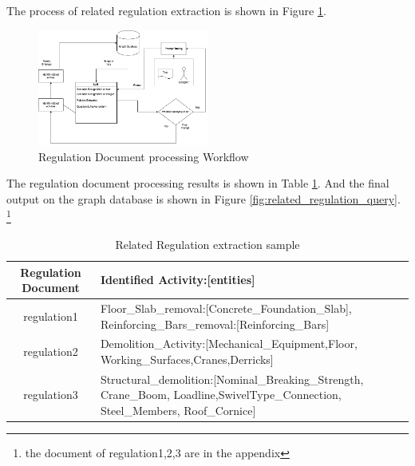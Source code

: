 The process of related regulation extraction is shown in Figure \ref{fig:related_regulation_workflow}.
\begin{figure}
    \label{fig:related_regulation_workflow}
    \centering
    \includegraphics[width=0.5\textwidth]{figures/text_extraction.png}
    \caption{Regulation Document processing Workflow}
\end{figure}

The regulation document processing results is shown in Table \ref{tab:related_regulation_sample}. %
And the final output on the graph database is shown in Figure \ref{fig:related_regulation_query}.
\footnote{the document of regulation1,2,3 are in the appendix}

\begin{table}
    \centering
    \label{tab:related_regulation_sample}
    \begin{tabularx}{0.5\textwidth}{cX}
        \hline
        \textbf{Regulation Document} & \textbf{Identified Activity:[entities]}  \\
        \hline
        regulation1 & Floor\_Slab\_removal:[Concrete\_Foundation\_Slab], \newline Reinforcing\_Bars\_removal:[Reinforcing\_Bars]  \\
        \hline
        regulation2 & Demolition\_Activity:[Mechanical\_Equipment,Floor, \newline Working\_Surfaces,Cranes,Derricks]  \\
        \hline
        regulation3 &  Structural\_demolition:[Nominal\_Breaking\_Strength, Crane\_Boom, Loadline,SwivelType\_Connection, Steel\_Members, Roof\_Cornice] \\
    \end{tabularx}
    \caption{Related Regulation extraction sample}
\end{table}

